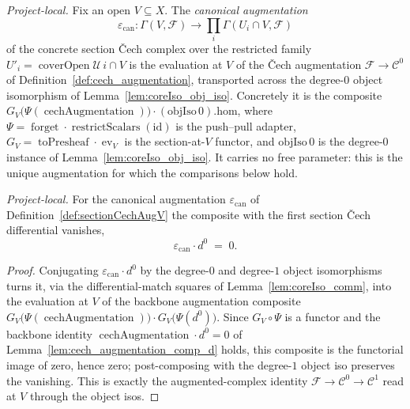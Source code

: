 \begin{definition}
  \label{def:sectionCechAugV}
  \textit{Project-local.}
  Fix an open \(V \subseteq X\). The \emph{canonical augmentation}
  \[
    \varepsilon_{\mathrm{can}} : \Gamma(V, \mathcal{F}) \longrightarrow
      \prod_i \Gamma(U_i \cap V, \mathcal{F})
  \]
  of the concrete section {\v C}ech complex over the restricted family
  \(U'_i = \operatorname{coverOpen}\mathcal{U}\,i \cap V\) is the evaluation at \(V\) of the {\v C}ech
  augmentation \(\mathcal{F} \to \mathcal{C}^0\) of Definition~\ref{def:cech_augmentation},
  transported across the degree-\(0\) object isomorphism of Lemma~\ref{lem:coreIso_obj_iso}.
  Concretely it is the composite
  \(G_V\bigl(\Psi(\operatorname{cechAugmentation})\bigr) \cdot (\mathrm{objIso}\,0).\mathrm{hom}\),
  where \(\Psi = \operatorname{forget}\cdot\operatorname{restrictScalars}(\mathrm{id})\) is the
  push--pull adapter, \(G_V = \operatorname{toPresheaf}\cdot\operatorname{ev}_V\) is the
  section-at-\(V\) functor, and \(\mathrm{objIso}\,0\) is the degree-\(0\) instance of
  Lemma~\ref{lem:coreIso_obj_iso}. It carries no free parameter: this is the unique augmentation
  for which the comparisons below hold.
\end{definition}

\begin{lemma}
  \label{lem:sectionCechAugV_comp_d}
  \textit{Project-local.}
  For the canonical augmentation \(\varepsilon_{\mathrm{can}}\) of
  Definition~\ref{def:sectionCechAugV} the composite with the first section {\v C}ech
  differential vanishes,
  \[
    \varepsilon_{\mathrm{can}} \cdot d^0 \;=\; 0.
  \]
\end{lemma}
\begin{proof}
  Conjugating \(\varepsilon_{\mathrm{can}} \cdot d^0\) by the degree-\(0\) and degree-\(1\) object
  isomorphisms turns it, via the differential-match squares of Lemma~\ref{lem:coreIso_comm}, into
  the evaluation at \(V\) of the backbone augmentation composite
  \(G_V\bigl(\Psi(\operatorname{cechAugmentation})\bigr) \cdot
  G_V\bigl(\Psi(d^0)\bigr)\). Since \(G_V\circ\Psi\) is a functor and the backbone identity
  \(\operatorname{cechAugmentation}\cdot d^0 = 0\) of Lemma~\ref{lem:cech_augmentation_comp_d}
  holds, this composite is the functorial image of zero, hence zero; post-composing with the
  degree-\(1\) object iso preserves the vanishing. This is exactly the augmented-complex identity
  \(\mathcal{F} \to \mathcal{C}^0 \to \mathcal{C}^1\) read at \(V\) through the object isos.
\end{proof}

